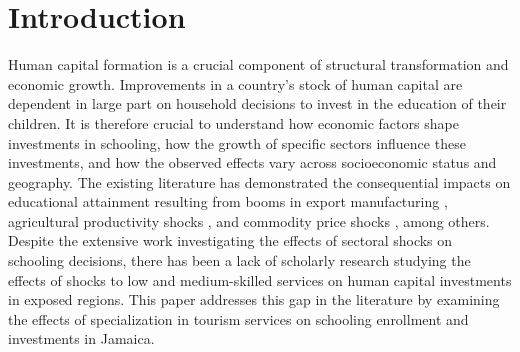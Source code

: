 \documentclass[12pt]{article}
\begin{document}
\fi

	\section{Introduction}
	\label{section:intro}
	\setlength{\parindent}{20pt}

    Human capital formation is a crucial component of structural transformation and economic growth. Improvements in a country's stock of human capital are dependent in large part on household decisions to invest in the education of their children. It is therefore crucial to understand how economic factors shape investments in schooling, how the growth of specific sectors influence these investments, and how the observed effects vary across socioeconomic status and geography. The existing literature has demonstrated the consequential impacts on educational attainment resulting from booms in export manufacturing \textcite{ atkin_endogenous_2016}, agricultural productivity shocks \parencite{ shah_drought_2017}, and commodity price shocks \parencite{ carrillo_present_2020}, among others. Despite the extensive work investigating the effects of sectoral shocks on schooling decisions, there has been a lack of scholarly research studying the effects of shocks to low and medium-skilled services on human capital investments in exposed regions. This paper addresses this gap in the literature by examining the effects of specialization in tourism services on schooling enrollment and investments in Jamaica. 

	 	
\end{document}
